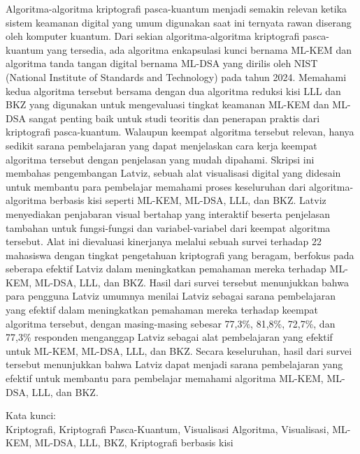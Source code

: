 \noindent Algoritma-algoritma kriptografi pasca-kuantum menjadi semakin relevan ketika sistem keamanan digital yang umum digunakan saat ini ternyata rawan diserang oleh komputer kuantum. Dari sekian algoritma-algoritma kriptografi pasca-kuantum yang tersedia, ada algoritma enkapsulasi kunci bernama ML-KEM dan algoritma tanda tangan digital bernama ML-DSA yang dirilis oleh NIST (National Institute of Standards and Technology) pada tahun 2024. Memahami kedua algoritma tersebut bersama dengan dua algoritma reduksi kisi LLL dan BKZ yang digunakan untuk mengevaluasi tingkat keamanan ML-KEM dan ML-DSA sangat penting baik untuk studi teoritis dan penerapan praktis dari kriptografi pasca-kuantum. Walaupun keempat algoritma tersebut relevan, hanya sedikit sarana pembelajaran yang dapat menjelaskan cara kerja keempat algoritma tersebut dengan penjelasan yang mudah dipahami. Skripsi ini membahas pengembangan Latviz, sebuah alat visualisasi digital yang didesain untuk membantu para pembelajar memahami proses keseluruhan dari algoritma-algoritma berbasis kisi seperti ML-KEM, ML-DSA, LLL, dan BKZ. Latviz menyediakan penjabaran visual bertahap yang interaktif beserta penjelasan tambahan untuk fungsi-fungsi dan variabel-variabel dari keempat algoritma tersebut. Alat ini dievaluasi kinerjanya melalui sebuah survei terhadap 22 mahasiswa dengan tingkat pengetahuan kriptografi yang beragam, berfokus pada seberapa efektif Latviz dalam meningkatkan pemahaman mereka terhadap ML-KEM, ML-DSA, LLL, dan BKZ. Hasil dari survei tersebut menunjukkan bahwa para pengguna Latviz umumnya menilai Latviz sebagai sarana pembelajaran yang efektif dalam meningkatkan pemahaman mereka terhadap keempat algoritma tersebut, dengan masing-masing sebesar 77,3\%, 81,8\%, 72,7\%, dan 77,3\% responden menganggap Latviz sebagai alat pembelajaran yang efektif untuk ML-KEM, ML-DSA, LLL, dan BKZ. Secara keseluruhan, hasil dari survei tersebut menunjukkan bahwa Latviz dapat menjadi sarana pembelajaran yang efektif untuk membantu para pembelajar memahami algoritma ML-KEM, ML-DSA, LLL, dan BKZ. \\

\vspace*{0.2cm}

\noindent Kata kunci: \\ Kriptografi, Kriptografi Pasca-Kuantum, Visualisasi Algoritma, Visualisasi, ML-KEM, ML-DSA, LLL, BKZ, Kriptografi berbasis kisi \\

\newpage
